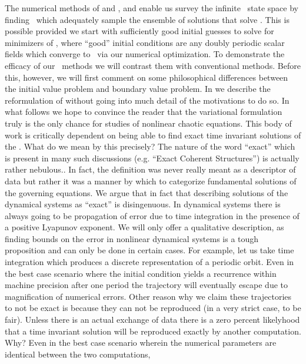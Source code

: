 The numerical methods of  and
, and 
enable us survey the infinite \spt\ state space by
finding \twots\ which adequately sample the ensemble of
solutions
that solve .
This is possible provided we start with sufficiently good
initial guesses to solve for minimizers of ,
where ``good'' initial conditions are any doubly periodic scalar fields
which converge to \twots\ via our numerical optimization.
To demonstrate the efficacy of our \spt\ methods we will
contrast them with conventional methods. Before this, however,
we will first comment on some philosophical differences between
the initial value problem and boundary value problem.
In  we describe the reformulation
of  without going into much detail of the motivations
to do so. In what follows we hope to convince the reader that
the variational formulation truly is the only chance for studies
of nonlinear chaotic equations.
This body of work is critically dependent
on being able to find exact time invariant solutions of the \KSe.
What do we mean by this precisely?
The nature of the word ``exact'' which is present in many such
discussions (e.g. ``Exact Coherent Structures'')
is actually rather nebulous..
In fact, the definition was never really meant as a descriptor
of data but rather it was a manner by which to categorize
fundamental solutions of the governing equations.
We argue that in fact that describing solutions of
the dynamical systems as ``exact'' is disingenuous. In dynamical
systems there is always going to be propagation of error
due to time integration in the presence of a positive Lyapunov
exponent. We will only offer a qualitative description, as
finding bounds on the error in nonlinear dynamical systems
is a tough proposition and can only be done in certain cases.
For example, let us take time integration which produces a discrete
representation of a periodic orbit. Even in the best case
scenario where the initial condition yields a
recurrence within machine precision after one period
the trajectory will eventually escape due to magnification
of numerical errors. Other reason why we claim these trajectories
to not be exact is because they can not be reproduced (in a very
strict case, to be fair).
Unless there
is an actual exchange of data there is a zero percent likelyhood
that a time invariant solution will be reproduced exactly by
another computation. Why? Even in the best case scenario wherein the
numerical parameters are identical between the two computations,
